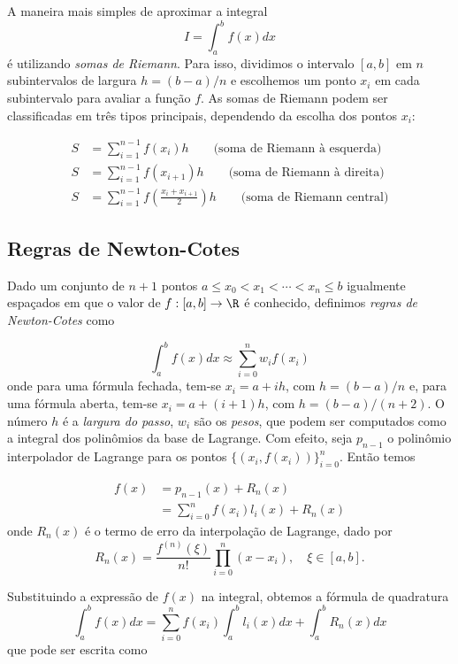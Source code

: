 \documentclass{article}
\begin{document}
A maneira mais simples de aproximar a integral \[I = \int_{a}^{b} f(x) dx\] é utilizando \emph{somas de Riemann}. Para isso, dividimos o intervalo \([a, b]\) em \(n\) subintervalos de largura \(h = (b-a)/n\) e escolhemos um ponto \(x_i\) em cada subintervalo para avaliar a função \(f\). As somas de Riemann podem ser classificadas em três tipos principais, dependendo da escolha dos pontos \(x_i\):

\begin{align}
    S & = \sum_{i=1}^{n-1} f(x_i)h \qquad\text{(soma de Riemann à esquerda)} \\
    S & = \sum_{i=1}^{n-1} f(x_{i+1})h \qquad \text{(soma de Riemann à direita)} \\
    S & = \sum_{i=1}^{n-1} f\left(\frac{x_i + x_{i+1}}{2}\right)h \qquad \text{(soma de Riemann central)}
\end{align}

\subsection{Regras de Newton-Cotes}

Dado um conjunto de \(n+1\) pontos \(a \leq x_0 < x_1 < \cdots < x_n \leq b\) igualmente espaçados em que o valor de \(f: [a,b] \to \R\) é conhecido, definimos \emph{regras de Newton-Cotes} como

\begin{equation}
    \int_{a}^{b} f(x) dx \approx \sum_{i=0}^{n} w_i f(x_i)
\end{equation}
onde para uma fórmula fechada, tem-se \(x_i = a + ih\), com \(h = (b-a)/n\) e, para uma fórmula aberta, tem-se \(x_i = a + (i+1)h\), com \(h = (b-a)/(n+2)\). O número \(h\) é a \emph{largura do passo}, \(w_i\) são os \emph{pesos}, que podem ser computados como a integral dos polinômios da base de Lagrange. Com efeito, seja \(p_{n-1}\) o polinômio interpolador de Lagrange para os pontos \(\{(x_i, f(x_i))\}_{i=0}^{n}\). Então temos

\begin{align}
    f(x) &= p_{n-1}(x) + R_n(x) \\
    & = \sum_{i=0}^{n} f(x_i) l_i(x) + R_n(x)
\end{align}
onde \(R_n(x)\) é o termo de erro da interpolação de Lagrange, dado por
\begin{equation}
    R_n(x) = \frac{f^{(n)}(\xi)}{n!} \prod_{i=0}^{n} (x - x_i), \quad \xi \in [a, b].
\end{equation}

Substituindo a expressão de \(f(x)\) na integral, obtemos a fórmula de quadratura
\begin{equation}
    \int_{a}^{b} f(x) dx = \sum_{i=0}^{n} f(x_i) \int_{a}^{b} l_i(x) dx + \int_{a}^{b} R_n(x) dx
\end{equation}
que pode ser escrita como
\end{document}

